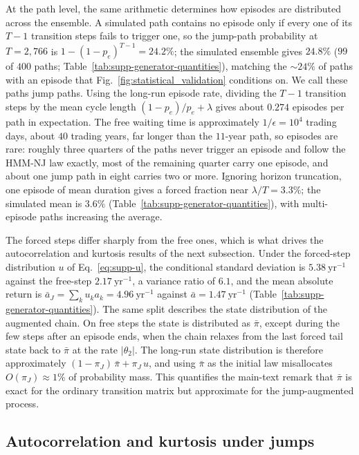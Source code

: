 At the path level, the same arithmetic determines how episodes are
distributed across the ensemble. A simulated path contains no episode
only if every one of its $T - 1$ transition steps fails to trigger
one, so the jump-path probability at $T = 2{,}766$ is
$1 - (1 - p_e)^{T-1} = 24.2\%$; the simulated ensemble
gives $24.8\%$ ($99$ of $400$ paths;
Table~\ref{tab:supp-generator-quantities}), matching the $\sim\!24\%$
of paths with an episode that
Fig.~\ref{fig:statistical_validation} conditions on. We call these
paths jump paths. Using the long-run episode rate, dividing the $T - 1$ transition
steps by the mean cycle length $(1 - p_e)/p_e + \lambda$ gives about $0.274$
episodes per path in expectation. The free waiting time is approximately
$1/\epsilon = 10^4$ trading days, about $40$ trading years, far
longer than the $11$-year path, so episodes are rare: roughly three quarters of the paths never trigger an
episode and follow the HMM-NJ law exactly, most of the remaining
quarter carry one episode, and about one jump path in eight carries
two or more. Ignoring horizon truncation, one episode of mean duration gives a
forced fraction near $\lambda / T = 3.3\%$; the simulated mean is
$3.6\%$ (Table~\ref{tab:supp-generator-quantities}), with multi-episode paths increasing the average.

The forced steps differ sharply from the free ones, which is what
drives the autocorrelation and kurtosis results of the next
subsection. Under the forced-step distribution $u$ of
Eq.~\eqref{eq:supp-u}, the conditional standard deviation is
$5.38~\mathrm{yr}^{-1}$ against the free-step $2.17~\mathrm{yr}^{-1}$,
a variance ratio of $6.1$, and the mean absolute return is
$\bar a_J = \sum_k u_k a_k = 4.96~\mathrm{yr}^{-1}$ against
$\bar a = 1.47~\mathrm{yr}^{-1}$
(Table~\ref{tab:supp-generator-quantities}). The same split describes
the state distribution of the augmented chain. On free steps the state
is distributed as $\bar\pi$, except during the few steps after an
episode ends, when the chain relaxes from the last forced tail state
back to $\bar\pi$ at the rate $|\theta_2|$. The long-run state
distribution is therefore approximately $(1 - \pi_J)\,\bar\pi +
\pi_J\, u$, and using $\bar\pi$ as the initial law misallocates
$O(\pi_J) \approx 1\%$ of probability mass. This quantifies the
main-text remark that $\bar\pi$ is exact for the ordinary transition
matrix but approximate for the jump-augmented process.

\subsection{Autocorrelation and kurtosis under jumps}
\label{sec:supp-gen-tuning}

